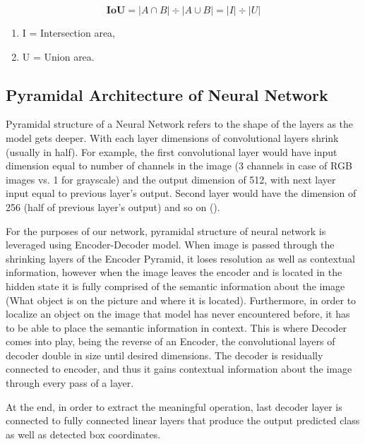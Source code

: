 \documentclass{article}
\begin{document}
\begin{equation}
	\textbf{IoU} = |A \cap B| \div  |A \cup B| = |I| \div |U|
\end{equation}

\begingroup
\fontsize{7pt}{9pt}\selectfont
\begin{enumerate}
	\item[]  \begin{center} I = Intersection area, \end{center}
	\item[] \begin{center}  U = Union area. \end{center}
\end{enumerate}
\endgroup


\subsection{Pyramidal Architecture of Neural Network}

Pyramidal structure of a Neural Network refers to the shape of the layers as the model
gets deeper. With each layer dimensions of convolutional layers shrink (usually in half).
For example, the first convolutional layer would have input dimension equal to number of
channels in the image (3 channels in case of RGB images vs. 1 for grayscale) and the output
dimension of 512, with next layer input equal to previous layer's output. Second layer
would have the dimension of 256 (half of previous layer's output) and so on ().

For the purposes of our network, pyramidal structure of neural network is leveraged using
Encoder-Decoder model. When image is passed through the shrinking layers of the Encoder
Pyramid, it loses resolution as well as contextual information, however when the image
leaves the encoder and is located in the hidden state it is fully comprised of
the semantic information about the image (What object is on the picture and where it is
located). Furthermore, in order to localize an object on the image that model has never 
encountered before, it has to be able to place the semantic information in context. 
This is where Decoder comes into play, being the reverse of an Encoder, the convolutional
layers of decoder double in size until desired dimensions. The decoder is residually
connected to encoder, and thus it gains contextual information about the image through
every pass of a layer.

At the end, in order to extract the meaningful operation, last decoder layer is connected
to fully connected linear layers that produce the output predicted class as well as
detected box coordinates.

\newpage


\end{document}
